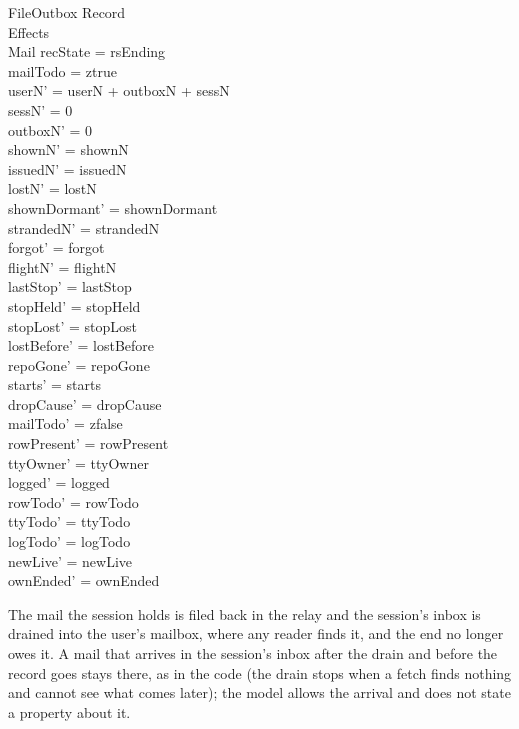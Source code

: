 \documentclass[a4paper,10pt,fleqn]{article}
\begin{document}
\begin{schema}{FileOutbox}
  \Xi Record \\
  \Delta Effects \\
  \Delta Mail
  \where
  recState = rsEnding \\
  mailTodo = ztrue \\
  userN' = userN + outboxN + sessN \\
  sessN' = 0 \\
  outboxN' = 0 \\
  shownN' = shownN \\
  issuedN' = issuedN \\
  lostN' = lostN \\
  shownDormant' = shownDormant \\
  strandedN' = strandedN \\
  forgot' = forgot \\
  flightN' = flightN \\
  lastStop' = lastStop \\
  stopHeld' = stopHeld \\
  stopLost' = stopLost \\
  lostBefore' = lostBefore \\
  repoGone' = repoGone \\
  starts' = starts \\
  dropCause' = dropCause \\
  mailTodo' = zfalse \\
  rowPresent' = rowPresent \\
  ttyOwner' = ttyOwner \\
  logged' = logged \\
  rowTodo' = rowTodo \\
  ttyTodo' = ttyTodo \\
  logTodo' = logTodo \\
  newLive' = newLive \\
  ownEnded' = ownEnded
\end{schema}

The mail the session holds is filed back in the relay and the session's inbox is
drained into the user's mailbox, where any reader finds it, and the end no longer
owes it.  A mail that arrives in the session's inbox after the drain and before
the record goes stays there, as in the code (the drain stops when a fetch finds
nothing and cannot see what comes later); the model allows the arrival and does
not state a property about it.
\end{document}
